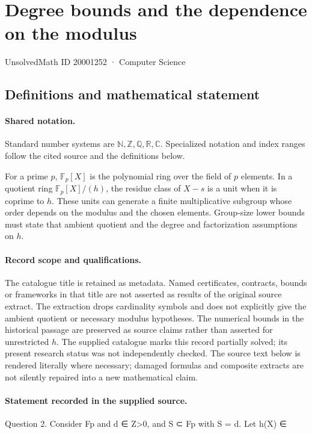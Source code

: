 \documentclass[11pt]{article}
\begin{document}
\setcounter{section}{20001251}
\section{Degree bounds and the dependence on the modulus}\label{20001252}
{\small\sffamily UnsolvedMath ID 20001252 · Computer Science}
\subsection{Definitions and mathematical statement}

\paragraph{Shared notation.}Standard number systems are $\mathbb N,\mathbb Z,\mathbb Q,\mathbb R,\mathbb C$. Specialized notation and index ranges follow the cited source and the definitions below.


For a prime $p$, $\mathbb F_p[X]$ is the polynomial ring over the field of $p$ elements. In a quotient ring $\mathbb F_p[X]/(h)$, the residue class of $X-s$ is a unit when it is coprime to $h$. These units can generate a finite multiplicative subgroup whose order depends on the modulus and the chosen elements. Group-size lower bounds must state that ambient quotient and the degree and factorization assumptions on $h$.
\paragraph{Record scope and qualifications.}
The catalogue title is retained as metadata. Named certificates, contracts, bounds or frameworks in that title are not asserted as results of the original source extract.
The extraction drops cardinality symbols and does not explicitly give the ambient quotient or necessary modulus hypotheses. The numerical bounds in the historical passage are preserved as source claims rather than asserted for unrestricted $h$. The supplied catalogue marks this record partially solved; its present research status was not independently checked.
The source text below is rendered literally where necessary; damaged formulas and composite extracts are not silently repaired into a new mathematical claim.
\paragraph{Statement recorded in the supplied source.}
Question 2. Consider Fp and d ∈ Z>0, and S ⊂ Fp with S = d. Let h(X) ∈
\end{document}
